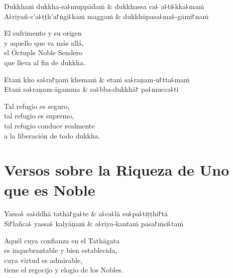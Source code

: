 \begin{twochants}
  Dukkhaṁ dukkha-sa꜕muppādaṁ & dukkhassa ca꜕ a꜕ti꜕kka꜕maṁ \\
  A꜕riyañ-c'a꜕ṭṭh'a꜓ṅgi꜕kaṁ maggaṁ & dukkhūpasa꜕ma꜕-gāmi꜓naṁ \\
\end{twochants}

\begin{english}
  El sufrimento y su origen \\
  y aquello que va más allá,\\
  el Óctuple Noble Sendero\\
  que lleva al fin de dukkha.
\end{english}

\begin{twochants}
  Etaṁ kho sa꜕ra꜓ṇaṁ khemaṁ & etaṁ sa꜕raṇam-u꜓tta꜕maṁ \\
  Etaṁ sa꜕raṇam-āgamma & sa꜕bba-dukkhā꜓ pa꜕mucca꜕ti \\
\end{twochants}

\begin{english}
  Tal refugio es seguro,\\
  tal refugio es supremo,\\
  tal refugio conduce realmente\\
  a la liberación de todo dukkha.
\end{english}

\chapter{Versos sobre la Riqueza de Uno que es Noble}


\begin{leader}
\end{leader}

\begin{twochants}
  Yassa꜕ sa꜕ddhā tathā꜓ga꜕te & a꜕ca꜕lā su꜕pa꜕tiṭṭhi꜓tā \\
  Sī꜓lañca꜕ yassa꜕ kalyāṇaṁ & a꜕riya-kantaṁ pasa꜓ṁsi꜕taṁ \\
\end{twochants}

\begin{english}
  Aquél cuya confianza en el Tathāgata\\
  es inquebrantable y bien establecida,\\
  cuya virtud es admirable,\\
  tiene el regocijo y elogio de los Nobles.
\end{english}

